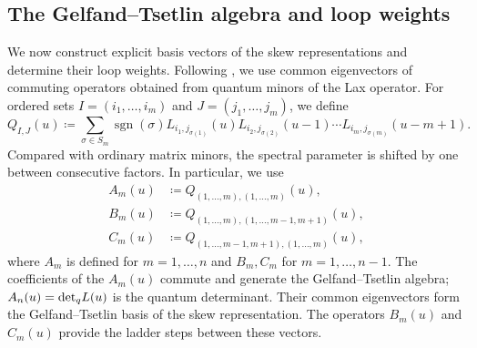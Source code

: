 \documentclass[12pt,reqno]{amsart}
\def\detq{{\rm det}_q}
\numberwithin{equation}{section}
\begin{document}


\subsection{The Gelfand--Tsetlin algebra and loop weights}
\label{subsec:GT_algebra}

We now construct explicit basis vectors of the skew representations
and determine their loop weights. Following \cite{NT1998}, we use
common eigenvectors of commuting operators obtained from quantum
minors of the Lax operator. For ordered sets
$I=(i_1,\ldots,i_m)$ and $J=(j_1,\ldots,j_m)$, we define
\begin{equation}
	Q_{I,J}(u)
	\coloneqq
	\sum_{\sigma\in S_m}\operatorname{sgn}(\sigma)
	L_{i_1,j_{\sigma(1)}}(u)
	L_{i_2,j_{\sigma(2)}}(u-1)\cdots
	L_{i_m,j_{\sigma(m)}}(u-m+1).
	\label{eqn:quantum_minor_GT}
\end{equation}
Compared with ordinary matrix minors, the spectral parameter is
shifted by one between consecutive factors. In particular, we use
\begin{align}
	A_m(u)&\coloneqq Q_{(1,\ldots,m),(1,\ldots,m)}(u),
	\label{eqn:GT_A_def}\\
	B_m(u)&\coloneqq Q_{(1,\ldots,m),(1,\ldots,m-1,m+1)}(u),
	\label{eqn:GT_B_def}\\
	C_m(u)&\coloneqq Q_{(1,\ldots,m-1,m+1),(1,\ldots,m)}(u),
	\label{eqn:GT_C_def}
\end{align}
where $A_m$ is defined for $m=1,\ldots,n$ and $B_m,C_m$ for
$m=1,\ldots,n-1$. The coefficients of the $A_m(u)$ commute
and generate the Gelfand--Tsetlin algebra; $A_n(u)=\detq L(u)$
is the quantum determinant. Their common eigenvectors form
the Gelfand--Tsetlin basis of the skew representation.
The operators $B_m(u)$ and $C_m(u)$ provide the ladder steps
between these vectors.
\end{document}
